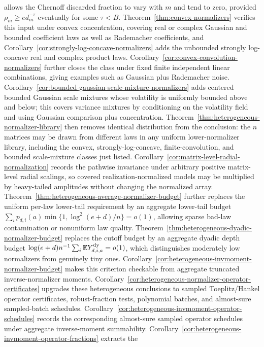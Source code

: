 \documentclass[11pt]{amsart}
\numberwithin{equation}{section}
\theoremstyle{definition}
\theoremstyle{remark}
\newcommand{\Exp}{\mathbb E}
\begin{document}
allows the Chernoff discarded fraction to vary with \(m\) and tend to zero,
provided \(\rho_m\ge e d_m^{-\tau}\) eventually for some \(\tau<B\).
Theorem~\ref{thm:convex-normalizers} verifies this input under convex
concentration, covering real or complex Gaussian and bounded coefficient laws
as well as Rademacher coefficients, and
Corollary~\ref{cor:strongly-log-concave-normalizers} adds the unbounded
strongly log-concave real and complex product laws.
Corollary~\ref{cor:convex-convolution-normalizers} further closes the class
under fixed finite independent linear combinations, giving examples such as
Gaussian plus Rademacher noise.
Corollary~\ref{cor:bounded-gaussian-scale-mixture-normalizers} adds centered
bounded Gaussian scale mixtures whose volatility is uniformly bounded above and
below; this covers variance mixtures by conditioning on the volatility field and
using Gaussian comparison plus concentration.
Theorem~\ref{thm:heterogeneous-normalizer-library} then removes identical
distribution from the conclusion: the \(n\) matrices may be drawn from different
laws in any uniform lower-normalizer library, including the convex,
strongly-log-concave, finite-convolution, and bounded scale-mixture classes just
listed.
Corollary~\ref{cor:matrix-level-radial-normalization} records the pathwise
invariance under arbitrary positive matrix-level radial scalings, so covered
realization-normalized models may be multiplied by heavy-tailed amplitudes
without changing the normalized array.
Theorem~\ref{thm:heterogeneous-average-normalizer-budget} further replaces the
uniform per-law lower-tail requirement by an aggregate lower-tail budget
\(\sum_i p_{d,i}(a)\min\{1,\log^2(e+d)/n\}=o(1)\), allowing sparse bad-law
contamination or nonuniform law quality.
Theorem~\ref{thm:heterogeneous-dyadic-normalizer-budget} replaces the cutoff
budget by an aggregate dyadic depth budget
\(\log(e+d)n^{-1}\sum_i\Exp Y_{d,i,a}^{\rm dy}=o(1)\), which distinguishes
moderately low normalizers from genuinely tiny ones.
Corollary~\ref{cor:heterogeneous-invmoment-normalizer-budget} makes this
criterion checkable from aggregate truncated inverse-normalizer moments.
Corollary~\ref{cor:heterogeneous-normalizer-operator-certificates} upgrades
these heterogeneous conclusions to sampled Toeplitz/Hankel operator certificates,
robust-fraction tests, polynomial batches, and almost-sure sampled-batch
schedules.
Corollary~\ref{cor:heterogeneous-invmoment-operator-schedules} records the
corresponding almost-sure sampled operator schedules under aggregate
inverse-moment summability.
Corollary~\ref{cor:heterogeneous-invmoment-operator-fractions} extracts the
\end{document}
